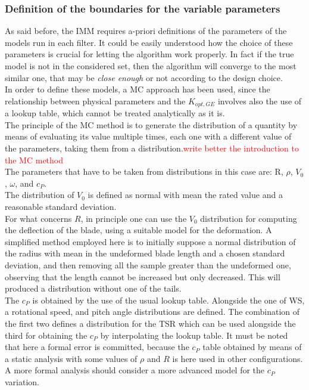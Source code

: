 \subsubsection{Definition of the boundaries for the variable parameters}
As said before, the IMM requires a-priori definitions of the parameters of the models run in each filter. It could be easily understood how the choice of these parameters is crucial for letting the algorithm work properly. In fact if the true model is not in the considered set, then the algorithm will converge to the most similar one, that may be \textit{close enough} or not according to the design choice.\\ 
In order to define these models, a \acrfull{MC} approach has been used, since the relationship between physical parameters and the $K_{opt,GE}$ involves also the use of a lookup table, which cannot be treated analytically as it is.\\
The principle of the \acrshort{MC} method is to generate the distribution of a quantity by means of evaluating its value multiple times, each one with a different value of the parameters, taking them from a distribution.\textcolor{red}{write better the introduction to the \acrshort{MC} method}\\
The parameters that have to be taken from distributions in this case are: R, $\rho$, $V_0$, $\omega$, and $c_P$.\\
The distribution of $V_0$ is defined as normal with mean the rated value and a reasonable standard deviation. \\
For what concerns $R$, in principle one can use the $V_0$ distribution for computing the deflection of the blade, using a suitable model for the deformation. A simplified method employed here is to initially suppose a normal distribution of the radius with mean in the undeformed blade length and a chosen standard deviation, and then removing all the sample greater than the undeformed one, observing that the length cannot be increased but only decreased. This will produced a distribution without one of the tails. \\
The $c_P$ is obtained by the use of the usual lookup table. Alongside the one of WS, a rotational speed, and pitch angle distributions are defined. The combination of the first two defines a distribution for the TSR which can be used alongside the third for obtaining the $c_P$ by interpolating the lookup table. It must be noted that here a formal error is committed, because the $c_P$ table obtained by means of a static analysis with some values of $\rho$ and $R$ is here used in other configurations. A more formal analysis should consider a more advanced model for the $c_P$ variation. 

